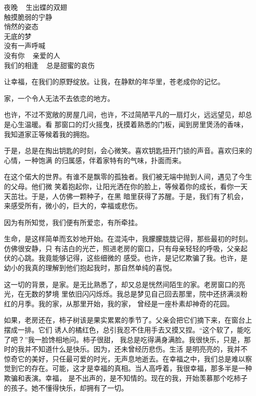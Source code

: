 	\endwriting


	\longpoem{}{}{}

		夜晚 ~ 生出蝶的双翅 \\
		触摸脆弱的宁静 \\
		悄然的姿态 \\
		无底的梦 \\
		没有一声呼喊 \\
		没有你 ~ 亲爱的人 \\
		我们的相逢 ~ 总是甜蜜的哀伤

	\endlongpoem
	\endwriting



		让幸福，在我们的原野绽放。让我，在静默的年华里，苍老成你的记忆。

		家，一个令人无法不去依恋的地方。

		也许，不过不宽敞的房屋几间，也许，不过简陋平凡的一扇灯火，远远望见，却总是心生温暖。看
	那窗口的灯火摇曳，抚摸着熟悉的门板，闻到房里煲汤的香味，我知道家正等候着我的拥抱。

		于是，总是在掏出钥匙的时刻，会心微笑。喜欢钥匙扭开门锁的声音。喜欢归来的心情，一种饱满
	的归属感，伴着家特有的气味，扑面而来。

		在这个偌大的世界。有谁不是飘零的孤独者。我们被无端中抛到人间，遇见了今生的父母。他们微
	笑着抱起你，让阳光洒在你的脸上，等候着你的成长，看你一天天茁壮。于是，人仿佛一颗种子，在黑
	暗里获得了苏醒。于是，我们有了机会，来感受所有，微小的，巨大的，幸福或悲伤。

		因为有所知觉，我们便有所爱恋，有所牵挂。

		生命，是这样简单而玄妙地开始。在混沌中，我朦朦胧胧记得，那些最初的时刻。仿佛很安静，只
	有洁白的光芒，照进老房的窗口，只有母亲轻轻的呼吸，父亲起伏的心跳。我竟能够记得，这些细微的
	感受。也许，是记忆欺骗了我。也许，是幼小的我真的理解到他们抱起我时，那自然单纯的喜悦。

		这一切的背景，是家。是无比熟悉了，却又总是恍然间陌生的家。老房窗口的亮光，在无数的梦境
	里依旧闪闪烁烁。我总是梦见自己回去那里，院中还挤满淡粉红的月季。我的家，从那里开始，我的家，
	曾经是一座朴素却神奇的花园。

		如果，老房还在，柿子树该是果实累累的季节了。父亲会把它们摘下来，在窗台上摆成一排。它们
	诱人的橘红色，总引我忍不住用手去又摸又捏。“这个软了，能吃了吧？”我一脸馋相地问。柿子很甜，
	我总是吃得满身满脸。我很快乐，只是，那时的我并不知道什么是快乐。因为，还未曾经历悲伤。生活
	是明亮亮的，我并不惊奇它的美好，只任最可爱的时光，无声息地逝去。在幸福之中，我们总是难以察
	觉到它的存在。可能，这才是幸福的真相。当人高呼着，我很幸福，那多半是一种欺骗和表演。幸福，
	是不出声的，是不知情的。现在的我，开始羡慕那个吃柿子的孩子。她不懂得快乐，却拥有了一切。

